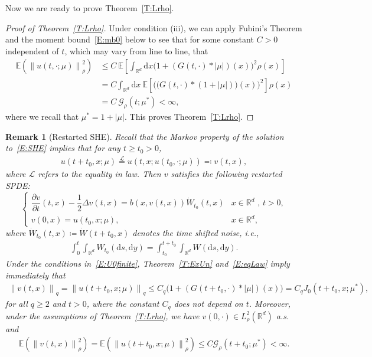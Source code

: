 \documentclass[sn-mathphys]{sn-jnl}%
\renewcommand{\R}{\mathbb{R}}
\newcommand{\E}{\mathbb{E}}
\newcommand{\Norm}[1]{\left\| #1 \right\|}
\newcommand{\ud}{\ensuremath{\mathrm{d}}}
\numberwithin{equation}{section}
\theoremstyle{thmstyleone}%
\theoremstyle{thmstyletwo}%
\newtheorem{remark}{Remark}[section]%
\theoremstyle{thmstylethree}%
\begin{document}
Now we are ready to prove Theorem~\ref{T:Lrho}.

\begin{proof}[Proof of Theorem~\ref{T:Lrho}]
  Under condition (iii), we can apply Fubini's Theorem and the moment bound~\eqref{E:mb0} below to
  see that for some constant $C>0$ independent of $t$, which may vary from line to line, that
  \begin{align*}
    \E\left(\Norm{u(t,\cdot;\mu)}_{\rho}^2\right)
    & \le C\: \E \left[\int_{\R^d}\ud x \bigg(1+(G(t,\cdot) * \lvert\mu\rvert)(x)\bigg)^2\rho(x)\right]           \\
    & = C \int_{\R^d} \ud x \: \E \left[\bigg(\Big(G(t,\cdot) *(1+\lvert\mu\rvert)\Big)(x) \bigg)^2\right]\rho(x) \\
    & = C \:\mathcal{G}_{\rho}(t;\mu^*) < \infty,
  \end{align*}
  where we recall that $\mu^* = 1+\lvert\mu\rvert$. This proves Theorem~\ref{T:Lrho}.
\end{proof}

\begin{remark}[Restarted SHE]\label{R:Restat}
  Recall that the Markov property of the solution to~\eqref{E:SHE} implies that for any $t\ge
  t_0>0$,
  \begin{align}\label{E:eqLaw}
    u(t + t_0,x;\mu) \stackrel{\mathcal{L}}{=}
    u\left(t,x;u\left(t_0,\cdot;\mu\right)\right) \eqqcolon v(t,x),
  \end{align}
  where $\mathcal{L}$ refers to the equality in law. Then $v$ satisfies the following restarted
  SPDE:
  \begin{equation}\label{E:restart}
    \begin{cases}
      \dfrac{\partial v}{\partial t}(t,x)-\dfrac{1}{2}\Delta v(t,x) = b(x,v(t,x))\dot W_{t_0}(t,x) & \text{$x\in \R^d$ , $t>0$}, \\
      v(0,x) = u(t_0,x;\mu),                                                                       & x\in\R^d,
    \end{cases}
  \end{equation}
  where $\dot{W}_{t_0}(t,x) \coloneqq \dot{W}(t + t_0,x)$ denotes the time shifted noise, i.e.,
  \begin{align}\label{E:ShiftW}
    \int_0^t \int_{\R^d} W_{t_0}(\ud s, \ud y) = \int_{t_0}^{t+t_0} \int_{\R^d} W(\ud s, \ud y).
  \end{align}
  Under the conditions in~\eqref{E:U0finite}, Theorem~\ref{T:ExUn} and~\eqref{E:eqLaw} imply
  immediately that
  \begin{align*}
  \Norm{v(t,x)}_q = \Norm{u(t+t_0,x;\mu)}_q
                  \le C_q\bigg(1 + (G(t+t_0, \cdot)* \lvert\mu\rvert)(x) \bigg)
                  = C_q J_0(t+t_0,x; \mu^*),
  \end{align*}
  for all $q\ge 2$ and $t>0$, where the constant $C_q$ does not depend on $t$. Moreover, under the
  assumptions of Theorem~\ref{T:Lrho}, we have $v(0,\cdot)\in L_\rho^2 (\R^d)$ a.s. and
  \begin{align*}
        \E\left(\Norm{v(t,x)}_\rho^2\right)
    = \E\left(\Norm{u(t+t_0,x;\mu)}_\rho^2\right)
    \le C \mathcal{G}_\rho(t+t_0;\mu^*)
    < \infty.
  \end{align*}
\end{remark}
\end{document}
